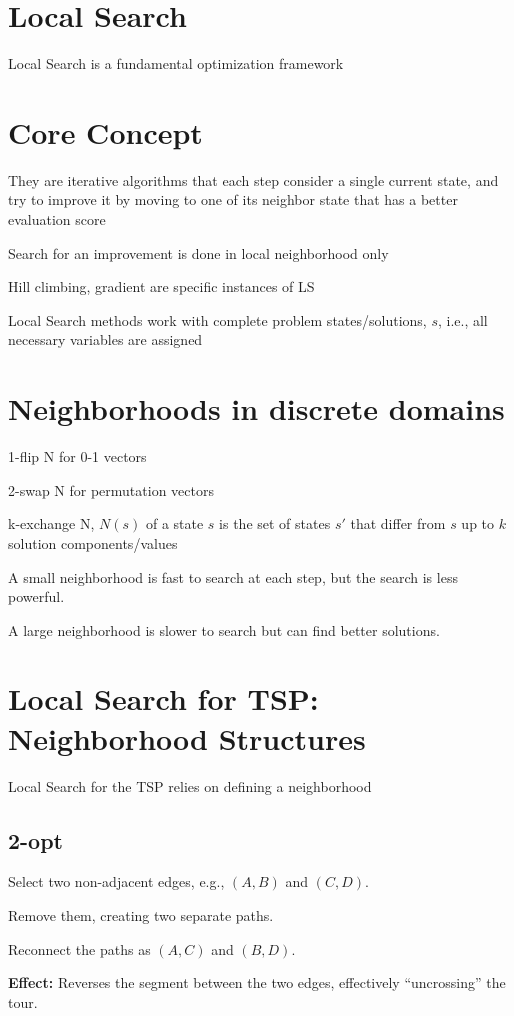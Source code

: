 \section*{Local Search}

Local Search is a fundamental optimization framework
\section*{Core Concept}

They are iterative algorithms that each step consider a single current state, and try to 
improve it by moving to one of its neighbor state that has a better evaluation 
score

\begin{tightitemize}
    \item Search for an improvement is done in local neighborhood only 
    \item Hill climbing, gradient are specific instances of LS
\end{tightitemize}

Local Search  methods work with complete problem
states/solutions, $s$, i.e., all necessary variables are assigned

\section*{Neighborhoods in discrete domains}

\begin{tightitemize}
    \item 1-flip N for 0-1 vectors
    \item 2-swap N for permutation vectors 
    \item k-exchange N, $N(s)$ of a state $s$ is the set of states $s'$ that differ
    from $s$ up to $k$ solution components/values
\end{tightitemize}

A small neighborhood is fast to search at each step, but the search is less powerful.

A large neighborhood is slower to search but can find better solutions.

\section*{Local Search for TSP: Neighborhood Structures}

Local Search for the TSP relies on defining a neighborhood

\subsection*{2-opt}
\begin{tightitemize}
    \item Select two non-adjacent edges, e.g., $(A,B)$ and $(C,D)$.
    \item Remove them, creating two separate paths.
    \item Reconnect the paths as $(A,C)$ and $(B,D)$.
\end{tightitemize}
\textbf{Effect:} Reverses the segment between the two edges, effectively ``uncrossing'' the tour.  

